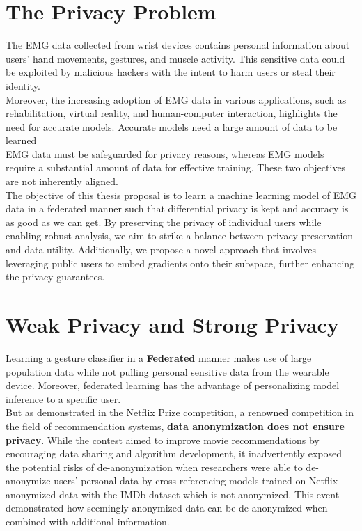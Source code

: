 \section{The Privacy Problem}

The EMG data collected from wrist devices contains personal information about users' hand movements, gestures, and muscle activity. This sensitive data could be exploited by malicious hackers with the intent to harm users or steal their identity. \\

Moreover, the increasing adoption of EMG data in various applications, such as rehabilitation, virtual reality, and human-computer interaction, highlights the need for accurate models. Accurate models need a large amount of data to be learned \\

EMG data must be safeguarded for privacy reasons, whereas EMG models require a substantial amount of data for effective training. These two objectives are not inherently aligned. \\



The objective of this thesis proposal is to learn a machine learning model of EMG data in a federated manner such that differential privacy is kept and accuracy is as good as we can get. By preserving the privacy of individual users while enabling robust analysis, we aim to strike a balance between privacy preservation and data utility. Additionally, we propose a novel approach that involves leveraging public users to embed gradients onto their subspace, further enhancing the privacy guarantees.\\

\section{Weak Privacy and Strong Privacy}
Learning a gesture classifier in a \textbf{Federated} manner makes use of large population data while not pulling personal sensitive data from the wearable device. Moreover, federated learning has the advantage of personalizing model inference to a specific user. \\

But as demonstrated in the Netflix Prize competition, a renowned competition in the field of recommendation systems, \textbf{data anonymization does not ensure privacy}. While the contest aimed to improve movie recommendations by encouraging data sharing and algorithm development, it inadvertently exposed the potential risks of de-anonymization when researchers were able to de-anonymize users' personal data by cross referencing models trained on Netflix anonymized data with the IMDb dataset which is not anonymized. This event demonstrated how seemingly anonymized data can be de-anonymized when combined with additional information. 

